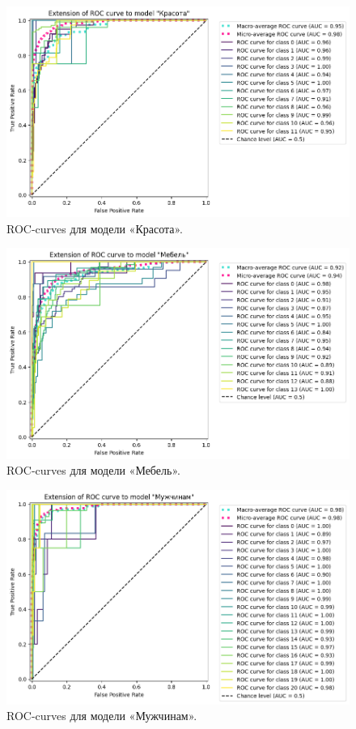 \documentclass[a4paper,12pt]{extarticle}
\begin{document}
\begin{figure}[hbtp]
	\centering
	\includegraphics[scale=0.7]{roc_curves/roccurve_Красота.png}
	\caption{ROC-curves для модели «Красота».}
	\label{fig:roccurve_Красота}
\end{figure}

\begin{figure}[hbtp]
	\centering
	\includegraphics[scale=0.7]{roc_curves/roccurve_Мебель.png}
	\caption{ROC-curves для модели «Мебель».}
	\label{fig:roccurve_Мебель}
\end{figure}

\begin{figure}[hbtp]
	\centering
	\includegraphics[scale=0.7]{roc_curves/roccurve_Мужчинам.png}
	\caption{ROC-curves для модели «Мужчинам».}
	\label{fig:roccurve_Мужчинам}
\end{figure}
\end{document}
